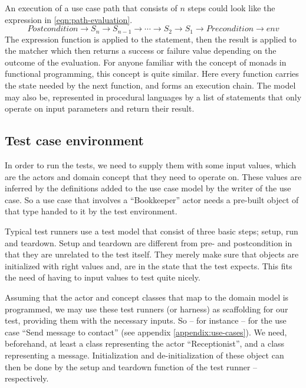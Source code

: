 \noindent An execution of a use case path that consists of $n$ steps could look like the expression in \ref{eqn:path-evaluation}. 
\begin{equation}
Postcondition \rightarrow S_n \rightarrow S_{n-1} \rightarrow \dotsb \rightarrow S_2 \rightarrow S_1 \rightarrow Precondition \rightarrow env
\label{eqn:path-evaluation}
\end{equation}
The expression function is applied to the statement, then the result is applied to the matcher which then returns a success or failure value depending on the outcome of the evaluation. For anyone familiar with the concept of monads in functional programming, this concept is quite similar. Here every function carries the state needed by the next function, and forms an execution chain. The model may also be, represented in procedural languages by a list of statements that only operate on input parameters and return their result.

\subsection{Test case environment}
\label{sec:test_case_state}
In order to run the tests, we need to supply them with some input values, which are the actors and domain concept that they need to operate on. These values are inferred by the definitions added to the use case model by the writer of the use case. So a use case that involves a ``Bookkeeper'' actor needs a pre-built object of that type handed to it by the test environment.\medskip

\noindent Typical test runners use a test model that consist of three basic steps; setup, run and teardown. Setup and teardown are different from pre- and postcondition in that they are unrelated to the test itself. They merely make sure that objects are initialized with right values and, are in the state that the test expects. This fits the need of having to input values to test quite nicely.\medskip

\noindent Assuming that the actor and concept classes that map to the domain model is programmed, we may use these test runners (or harness) as scaffolding for our test, providing them with the necessary inputs. So -- for instance -- for the use case ``Send message to contact'' (see appendix \ref{appendix:use-cases}). We need, beforehand, at least a class representing the actor ``Receptionist'', and a class representing a message. Initialization and de-initialization of these object can then be done by the setup and teardown function of the test runner -- respectively.\medskip

